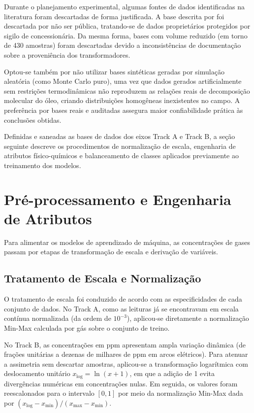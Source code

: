 Durante o planejamento experimental, algumas fontes de dados identificadas na literatura foram descartadas de forma justificada. A base descrita por  foi descartada por não ser pública, tratando-se de dados proprietários protegidos por sigilo de concessionária. Da mesma forma, bases com volume reduzido (em torno de 430 amostras) foram descartadas devido a inconsistências de documentação sobre a proveniência dos transformadores.

Optou-se também por não utilizar bases sintéticas geradas por simulação aleatória (como Monte Carlo puro), uma vez que dados gerados artificialmente sem restrições termodinâmicas não reproduzem as relações reais de decomposição molecular do óleo, criando distribuições homogêneas inexistentes no campo. A preferência por bases reais e auditadas assegura maior confiabilidade prática às conclusões obtidas.

Definidas e saneadas as bases de dados dos eixos Track A e Track B, a seção seguinte descreve os procedimentos de normalização de escala, engenharia de atributos físico-químicos e balanceamento de classes aplicados previamente ao treinamento dos modelos.

\section{Pré-processamento e Engenharia de Atributos}\label{sec:preprocessamento}

Para alimentar os modelos de aprendizado de máquina, as concentrações de gases passam por etapas de transformação de escala e derivação de variáveis.

\subsection{Tratamento de Escala e Normalização}

O tratamento de escala foi conduzido de acordo com as especificidades de cada conjunto de dados. No Track A, como as leituras já se encontravam em escala contínua normalizada (da ordem de $10^{-3}$), aplicou-se diretamente a normalização Min-Max calculada por gás sobre o conjunto de treino.

No Track B, as concentrações em ppm apresentam ampla variação dinâmica (de frações unitárias a dezenas de milhares de ppm em arcos elétricos). Para atenuar a assimetria sem descartar amostras, aplicou-se a transformação logarítmica com deslocamento unitário $x_{\text{log}} = \ln(x + 1)$, em que a adição de 1 evita divergências numéricas em concentrações nulas. Em seguida, os valores foram reescalonados para o intervalo $[0, 1]$ por meio da normalização Min-Max dada por $(x_{\text{log}} - x_{\text{min}}) / (x_{\text{max}} - x_{\text{min}})$.

